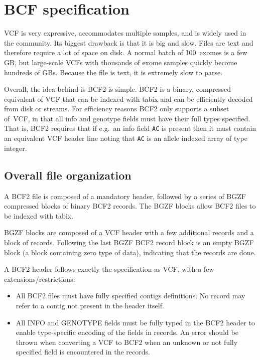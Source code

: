 \documentclass[8pt]{article}
\begin{document}
\pagebreak
\section{BCF specification}

VCF is very expressive, accommodates multiple samples, and is widely used
in the community.  Its biggest drawback is that it is big and slow.
Files are text and therefore require a lot of space on disk.  A normal batch
of \~100~exomes is a few GB, but large-scale VCFs with thousands of exome
samples quickly become hundreds of GBs.  Because the file is text, it is
extremely slow to parse.

Overall, the idea behind is BCF2 is simple.  BCF2 is a binary, compressed
equivalent of VCF that can be indexed with tabix and can be efficiently decoded
from disk or streams.  For efficiency reasons BCF2 only supports a subset
of~VCF, in that all info and genotype fields must have their full types
specified.  That is, BCF2 requires that if e.g.\ an info field {\tt AC} is
present then it must contain an equivalent VCF header line noting that {\tt AC}
is an allele indexed array of type integer.

\subsection{Overall file organization}

A BCF2 file is composed of a mandatory header, followed by a series of BGZF
compressed blocks of binary BCF2 records.  The BGZF blocks allow BCF2 files
to be indexed with tabix.

BGZF blocks are composed of a VCF header with a few additional records and a
block of records.  Following the last BGZF BCF2 record block is an empty
BGZF block (a block containing zero type of data), indicating that the
records are done.

A BCF2 header follows exactly the specification as VCF, with a few
extensions/restrictions:
\begin{itemize}
\item All BCF2 files must have fully specified contigs definitions.
No record may refer to a contig not present in the header itself.

\item All INFO and GENOTYPE fields must be fully typed in the BCF2 header to
enable type-specific encoding of the fields in records.  An error should be
thrown when converting a VCF to BCF2 when an unknown or not fully specified
field is encountered in the records.
\end{itemize}
\end{document}
